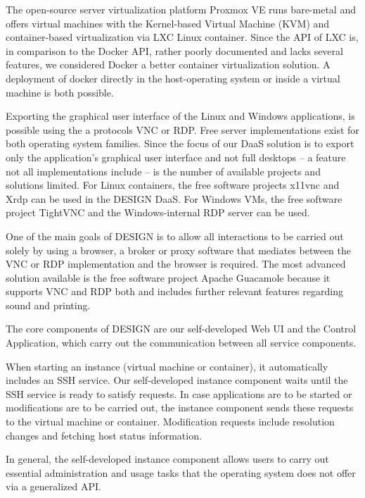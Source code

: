 \documentclass[runningheads]{llncs}
\begin{document}
The open-source server virtualization platform Proxmox VE runs bare-metal and offers virtual machines with the Kernel-based Virtual Machine (KVM) and container-based virtualization via LXC Linux container. Since the API of LXC is, in comparison to the Docker API, rather poorly documented and lacks several features, we considered Docker a better container virtualization solution. A deployment of docker directly in the host-operating system or inside a virtual machine is both possible.

Exporting the graphical user interface of the Linux and Windows applications,
is possible using the a protocols VNC or RDP. Free server implementations exist for both operating system families. Since the focus of our DaaS solution is to export only the application's graphical user interface and not full desktops -- a feature not all implementations include -- is the number of available projects and solutions limited. 
For Linux containers, the free software projects x11vnc and Xrdp can be used in the DESIGN DaaS. For Windows VMs, the free software project TightVNC and the Windows-internal RDP server can be used. 

One of the main goals of DESIGN is to allow all interactions to be carried out solely by using a browser, a broker or proxy software that mediates between the VNC or RDP implementation and the browser is required. The most advanced solution available is the free software project Apache Guacamole because it supports VNC and RDP both and includes further relevant features regarding sound and printing.

The core components of DESIGN are our self-developed Web UI and the Control Application, which carry out the communication between all service components. 

When starting an instance (virtual machine or container), it automatically includes an SSH service. Our self-developed instance component waits until the SSH service is ready to satisfy requests. In case applications are to be started or modifications are to be carried out, the instance component sends these requests to the virtual machine or container. Modification requests include resolution changes and fetching host status information.

In general, the self-developed instance component allows users to carry out essential administration and usage tasks that the operating system does not offer via a generalized API.

\end{document}
